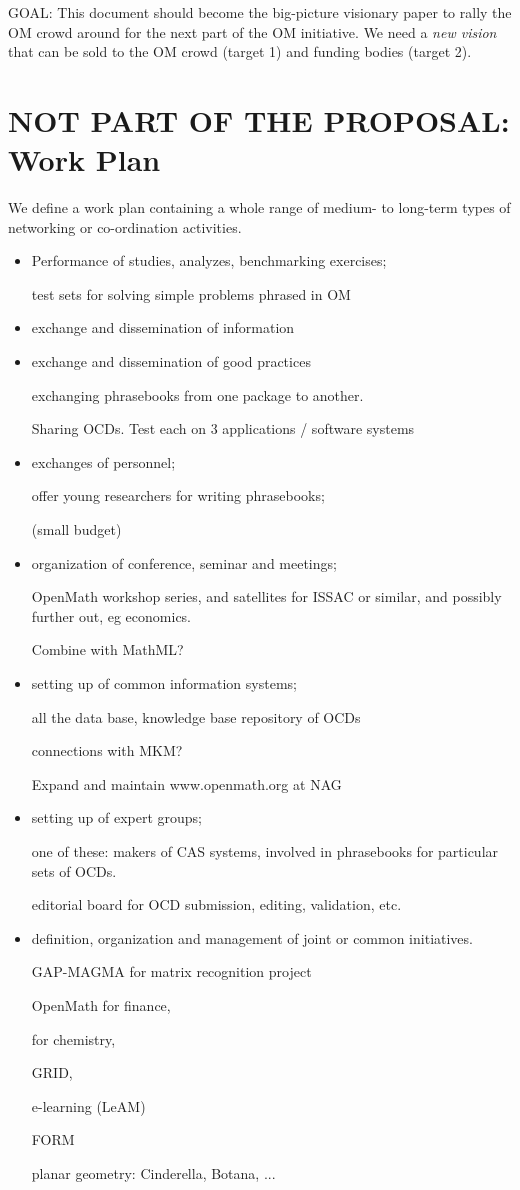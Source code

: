 \documentclass[draft]{artikel3}
\begin{document}
GOAL: This document should become the big-picture visionary paper to
rally the OM crowd around for the next part of the OM initiative.  We
need a \emph{new vision} that can be sold to the OM crowd (target 1)
and funding bodies (target 2).


\section{NOT PART OF THE PROPOSAL: Work Plan}
We define a work plan containing a whole range of medium- to long-term
types of networking or co-ordination activities.
\begin{itemize}
\item Performance of studies, analyzes, benchmarking exercises;

test sets for  solving simple problems phrased in OM


\item exchange and dissemination of information

\item exchange and dissemination of good practices

exchanging phrasebooks from one package to another.

Sharing OCDs.
Test each on 3 applications / software systems

\item exchanges of personnel;

offer young researchers for writing phrasebooks;

(small  budget)


\item organization of conference, seminar and meetings;

OpenMath workshop series, and satellites for ISSAC or similar, and
possibly further out, eg economics.

Combine with MathML?

\item setting up of common information systems;

all the data base, knowledge base repository of OCDs

connections with MKM?

Expand and maintain www.openmath.org at NAG


\item setting up of expert groups;

one of these: makers of CAS systems, involved in phrasebooks for
particular sets of OCDs.

editorial board for OCD submission, editing, validation, etc.

\item definition, organization and management of joint or common
  initiatives.

GAP-MAGMA for matrix recognition project

OpenMath for finance,

for chemistry,

GRID,

e-learning (LeAM)

FORM

planar geometry: Cinderella, Botana, ...



\end{itemize}
\end{document}
